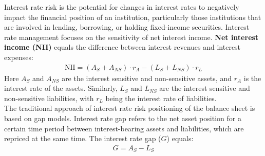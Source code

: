 \documentclass[11pt]{article}
\begin{document}
Interest rate risk is the potential for changes in interest rates to negatively impact the financial position of an institution, particularly those institutions that are involved in lending, borrowing, or holding fixed-income securities. Interest rate management focuses on the sensitivity of net interest income. \textbf{Net interest income (NII)} equals the difference between interest revenues and interest expenses:
\begin{align}
	\text{NII}=(A_S+A_{NS})\cdot r_A-(L_S+L_{NS})\cdot r_L
\end{align}
Here $A_S$ and $A_{NS}$ are the interest sensitive and non-sensitive assets, and $r_A$ is the interest rate of the assets. Similarly, $L_S$ and $L_{NS}$ are the interest sensitive and non-sensitive liabilities, with $r_L$ being the interest rate of liabilities.\\

 The traditional approach of interest rate risk positioning of the balance sheet is based on gap models. Interest rate gap refers to the net asset position for a certain time period between interest-bearing assets and liabilities, which are repriced at the same time. The interest rate gap ($G$) equals:
\begin{align}
	G=A_S-L_S
\end{align}
\end{document}
